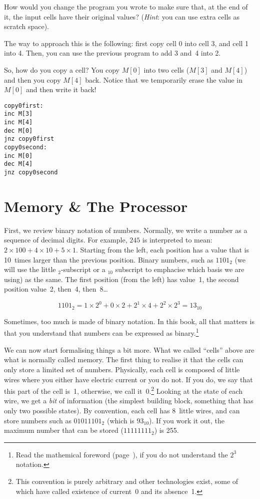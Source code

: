 \begin{exercise}
How would you change the program you wrote to make sure that, at the end of it,
the input cells have their original values? (\emph{Hint}: you can use extra
cells as scratch space).
\begin{solution}
The way to approach this is the following: first copy cell 0 into cell 3, and
cell 1 into 4. Then, you can use the previous program to add 3 and~4 into 2.

So, how do you copy a cell? You copy $M[0]$ into two cells ($M[3]$ and $M[4]$)
and then you copy $M[4]$ back. Notice that we temporarily erase the value in
$M[0]$ and then write it back!

\begin{verbatim}
copy0first:
inc M[3]
inc M[4]
dec M[0]
jnz copy0first
copy0second:
inc M[0]
dec M[4]
jnz copy0second
\end{verbatim}
\end{solution}
\end{exercise}

\section{Memory \& The Processor}

First, we review binary notation of numbers. Normally, we write a number as a
sequence of decimal digits. For example, $245$ is interpreted to mean: $2
\times 100 + 4 \times 10 + 5 \times 1$. Starting from the left, each position
has a value that is 10~times larger than the previous position. Binary numbers,
such as $1101_2$ (we will use the little $_2$-subscript or a $_{10}$ subscript
to emphacise which basis we are using) as the same. The first position (from
the left) has value~1, the second position value~2, then~4, then~8\ldots

\[
1101_2 = 1 \times 2^{0}  + 0 \times 2 + 2^1 \times 4 + 2^2 \times 2^3 = 13_{10}
\]

Sometimes, too much is made of binary notation. In this book, all that matters
is that you understand that numbers can be expressed as binary.\footnote{Read
the mathemical foreword (page~\pageref{chpt:mathforeword}), if you do not
understand the $2^3$ notation.}

We can now start formalising things a bit more. What we called ``cells'' above
are what is normally called memory. The first thing to realise it that the
cells can only store a limited set of numbers. Physically, each cell is
composed of little wires where you either have electric current or you do not.
If you do, we say that this part of the cell is~1, otherwise, we call
it~0.\footnote{This convention is purely arbitrary and other technologies
exist, some of which have called existence of current~0 and its absence~1.}
Looking at the state of each wire, we get a \emph{bit} of information (the
simplest building block, something that has only two possible states). By
convention, each cell has 8~little wires, and can store numbers such as
$01011101_2$ (which is $93_{10}$). If you work it out, the maximum number that
can be stored ($11111111_2$) is 255.

